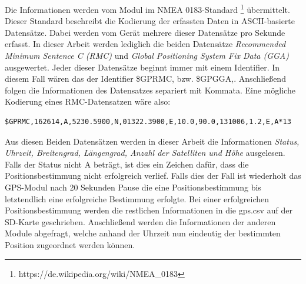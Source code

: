 \documentclass[a4paper,11pt, ngerman]{scrartcl}
\begin{document}
Die Informationen werden vom Modul im NMEA 0183-Standard \footnote{https://de.wikipedia.org/wiki/NMEA\_0183} übermittelt. Dieser Standard beschreibt die Kodierung der erfassten Daten in ASCII-basierte Datensätze. Dabei werden vom Gerät mehrere dieser Datensätze pro Sekunde erfasst. In dieser Arbeit werden lediglich die beiden Datensätze \textit{Recommended Minimum Sentence C (RMC)} und \textit{Global Positioning System Fix Data (GGA)} ausgewertet. Jeder dieser Datensätze beginnt immer mit einem Identifier. In diesem Fall wären das der Identifier \grqq \$GPRMC,\grqq{} bzw. \grqq \$GPGGA,\grqq{}. Anschließend folgen die Informationen des Datensatzes separiert mit Kommata. Eine mögliche Kodierung eines RMC-Datensatzen wäre also:
\begin{lstlisting}
$GPRMC,162614,A,5230.5900,N,01322.3900,E,10.0,90.0,131006,1.2,E,A*13
\end{lstlisting}
Aus diesen Beiden Datensätzen werden in dieser Arbeit die Informationen \textit{Status, Uhrzeit, Breitengrad, Längengrad, Anzahl der Satelliten und Höhe} ausgelesen. Falls der Status nicht \grqq A\grqq{} beträgt, ist dies ein Zeichen dafür, dass die Positionsbestimmung nicht erfolgreich verlief. Falls dies der Fall ist wiederholt das GPS-Modul nach 20 Sekunden Pause die eine Positionsbestimmung bis letztendlich eine erfolgreiche Bestimmung erfolgte. Bei einer erfolgreichen Positionsbestimmung werden die restlichen Informationen in die \grqq gps.csv\grqq{} auf der SD-Karte geschrieben. Anschließend werden die Informationen der anderen Module abgefragt, welche anhand der Uhrzeit nun eindeutig der bestimmten Position zugeordnet werden können.
\end{document}
